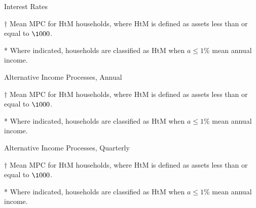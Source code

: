 \documentclass[9pt]{extarticle}
\begin{document}
\begin{table}[h]
\caption{Interest Rates}
\begin{threeparttable}
\centering


\begin{tablenotes}
	\item[$\dagger$] Mean MPC for HtM households, where HtM is defined as assets less than or equal to $\1000$.
	\item[*] Where indicated, households are classified as HtM when $a \leq 1\%$ mean annual income.
\end{tablenotes}
\end{threeparttable}
\end{table}

\begin{table}[h]
\caption{Alternative Income Processes, Annual}
\begin{threeparttable}
\centering


\begin{tablenotes}
	\item[$\dagger$] Mean MPC for HtM households, where HtM is defined as assets less than or equal to $\1000$.
	\item[*] Where indicated, households are classified as HtM when $a \leq 1\%$ mean annual income.
\end{tablenotes}
\end{threeparttable}
\end{table}

\begin{table}[h]
\caption{Alternative Income Processes, Quarterly}
\begin{threeparttable}
\centering


\begin{tablenotes}
	\item[$\dagger$] Mean MPC for HtM households, where HtM is defined as assets less than or equal to $\1000$.
	\item[*] Where indicated, households are classified as HtM when $a \leq 1\%$ mean annual income.
\end{tablenotes}
\end{threeparttable}
\end{table}
\end{document}
